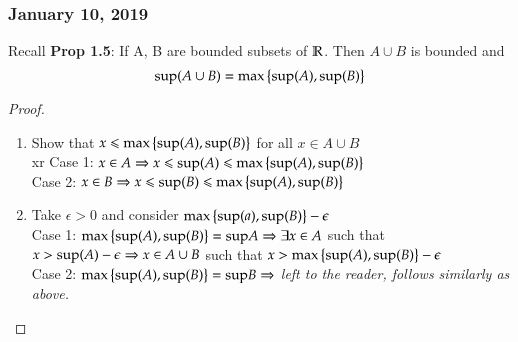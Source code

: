 \subsubsection*{January 10, 2019}

Recall \textbf{Prop 1.5}: 	If A, B are bounded subsets of $\mathbb{R}$. Then $A\cup B$ is bounded and
\[\mathrm{sup}(A\cup B) = \mathrm{max}\left\{ \mathrm{sup}(A), \mathrm{sup}(B) \right\}\]

\begin{proof}
  \begin{enumerate}[1]
    \item Show that $x \leqslant \mathrm{max}\left\{ \mathrm{sup}(A), \mathrm{sup}(B) \right\}$ for all $x\in A\cup B$ \\xr
    Case 1: $x\in A \Rightarrow x \leqslant \mathrm{sup}(A) \leqslant \mathrm{max}\left\{ \mathrm{sup}(A),\mathrm{sup}(B) \right\}$ \\
    Case 2: $x\in B \Rightarrow x \leqslant \mathrm{sup}(B) \leqslant \mathrm{max}\left\{ \mathrm{sup}(A),\mathrm{sup}(B) \right\}$

    \item Take $\epsilon > 0$ and consider $\mathrm{max}\left\{ \mathrm{sup}(a), \mathrm{sup}(B) \right\}-\epsilon$ \\
    Case 1: $\mathrm{max}\left\{ \mathrm{sup}(A), \mathrm{sup}(B) \right\}=\mathrm{sup} A \Rightarrow \exists x\in A$ such that $x>\mathrm{sup}(A)-\epsilon \Rightarrow x \in A\cup B $ such that $x>\mathrm{max}\left\{ \mathrm{sup}(A), \mathrm{sup}(B) \right\}-\epsilon$ \\
    Case 2: $\mathrm{max}\left\{ \mathrm{sup}(A), \mathrm{sup}(B) \right\}=\mathrm{sup} B \Rightarrow $ \textit{left to the reader, follows similarly as above. }
  \end{enumerate}
\end{proof}

